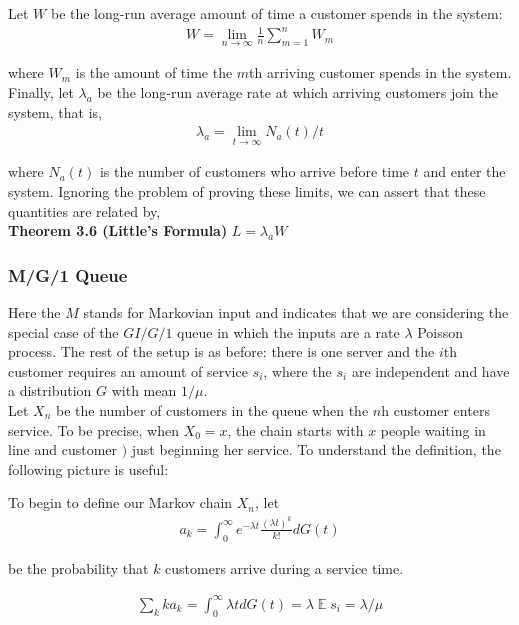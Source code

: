 \documentclass[12pt]{article}
\DeclareMathOperator*{\E}{\mathbb{E}}
\begin{document}
Let $W$ be the long-run average amount of time a customer spends in the system:
\begin{align*}
W = \lim_{n \to \infty} \frac{1}{n} \sum_{m=1}^n W_m
\end{align*}

where $W_m$ is the amount of time the $m$th arriving customer spends in the system. Finally, let $\lambda_{a}$ be the long-run average rate at which arriving customers join the system, that is,
\begin{align*}
\lambda_a = \lim_{t \to \infty} N_a(t)/t
\end{align*}

where $N_a(t)$ is the number of customers who arrive before time $t$ and enter the system. Ignoring the problem of proving these limits, we can assert that these quantities are related by,\\

\textbf{Theorem 3.6 (Little's Formula)} $L = \lambda_a W$\\


\subsubsection{M/G/1 Queue}

Here the $M$ stands for Markovian input and indicates that we are considering the special case of the $GI/G/1$ queue in which the inputs are a rate $\lambda$ Poisson process. The rest of the setup is as before: there is one server and the $i$th customer requires an amount of service $s_i$, where the $s_i$ are independent and have a distribution $G$ with mean $1/\mu$.\\

Let $X_n$ be the number of customers in the queue when the $n$h customer enters service. To be precise, when $X_0 = x$, the chain starts with $x$ people waiting in line and customer $)$ just beginning her service. To understand the definition, the following picture is useful:

To begin to define our Markov chain $X_n$, let
\begin{align*}
a_k = \int_0^{\infty} e^{-\lambda t} \frac{(\lambda t)^k}{k!} dG(t)
\end{align*}

be the probability that $k$ customers arrive during a service time.

\begin{align*}
\sum_k ka_k = \int_0^{\infty} \lambda t dG(t) = \lambda \E s_i = \lambda/\mu
\end{align*}
\end{document}

